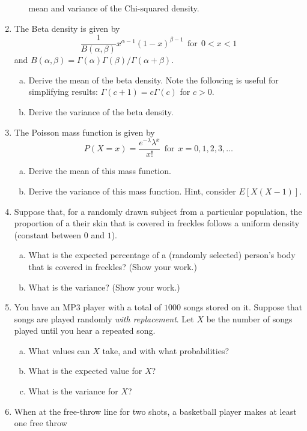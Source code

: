 \documentclass[12pt]{article}
\begin{document}
\begin{enumerate}[Problem 1.]
\begin{enumerate}[a.]
mean and variance of the Chi-squared density.
\end{enumerate}
\item The Beta density is given by
$$
\frac{1}{B(\alpha, \beta)} x^{\alpha - 1}(1 - x)^{\beta - 1} ~~\mbox{for}~~ 0 < x< 1
$$
and
$
B(\alpha, \beta) = \Gamma(\alpha)\Gamma(\beta)/\Gamma(\alpha + \beta).
$
\begin{enumerate}[a.]
\item Derive the mean of the beta density. Note the following is useful for simplifying results: $\Gamma(c + 1) = c\Gamma(c)$ for $c > 0$.
\item Derive the variance of the beta density.
\end{enumerate}
\item The Poisson mass function is given by
$$
P(X = x) = \frac{e^{-\lambda} \lambda^x}{x!} ~~ \mbox{for} ~~ x = 0, 1, 2, 3, \ldots
$$
\begin{enumerate}[a.]
\item Derive the mean of this mass function.
\item Derive the variance of this mass function. Hint, consider $E[X(X - 1)]$.
\end{enumerate}
\item Suppose that, for a randomly drawn subject from a particular
  population, the proportion of a their skin that is covered in
  freckles follows a uniform density (constant between $0$ and $1$).
  \begin{enumerate}[a.]
  \item What is the expected percentage of a (randomly selected) person's body that is covered in freckles? (Show your work.)
  \item What is the variance? (Show your work.)
  \end{enumerate}
\item  You have an MP3 player with a total of $1000$ songs stored on it. Suppose that songs are played
  randomly {\em with replacement}. Let $X$ be the number of songs played
  until you hear a repeated song.
  \begin{enumerate}[a.]
  \item What values can $X$ take, and with what probabilities?
  \item What is the expected value for $X$?
  \item What is the variance for $X$?
  \end{enumerate}
\item When at the free-throw line for two shots, a basketball player makes at least one free throw

\end{enumerate}
\end{document}
